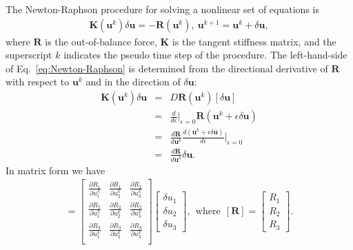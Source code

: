 The Newton-Raphson procedure for solving a nonlinear set of equations is \cite{JavierBonet:2008uxa}
%
\begin{eqnarray}
\pmb{K}(\pmb{u}^k) \delta \pmb{u} = - \pmb{R}(\pmb{u}^k), \ \pmb{u}^{k+1} = \pmb{u}^k + \delta \pmb{u},
\label{eq:Newton-Raphson}
\end{eqnarray}
%
where $\pmb{R}$ is the out-of-balance force, $\pmb{K}$ is the tangent stiffness matrix, and the superscript $k$ indicates the pseudo time step of the procedure. The left-hand-side of  Eq.\ \eqref{eq:Newton-Raphson} is determined from the directional derivative of $\pmb{R}$ with respect to $\pmb{u}^k$ and in the direction of $\delta \pmb{u}$:
%
\begin{eqnarray}
\pmb{K}(\pmb{u}^k) \delta \pmb{u} &=& D\pmb{R}(\pmb{u}^k)[\delta \pmb{u}] \nonumber\\
%
&=& \frac{d}{d\epsilon} \bigg|_{\epsilon=0}\pmb{R}(\pmb{u}^k + \epsilon \delta \pmb{u}) \nonumber\\
&=& \frac{d \pmb{R}}{d\pmb{u}^k} \frac{d(\pmb{u}^k + \epsilon \delta \pmb{u})}{d\epsilon} \bigg|_{\epsilon=0} \nonumber\\
&=& \frac{d \pmb{R}}{d\pmb{u}^k} \delta \pmb{u}.
\label{eq:DR[u]}
\end{eqnarray}
%
In matrix form we have
%
\begin{eqnarray}
[\pmb{K}(\pmb{u}^k)][\delta \pmb{u}] =
%
\begin{bmatrix}
\frac{\partial R_1}{\partial u_1^k} & \frac{\partial R_1}{\partial u_2^k} & \frac{\partial R_1}{\partial u_3^k} \\
%
\frac{\partial R_2}{\partial u_1^k} & \frac{\partial R_2}{\partial u_2^k} & \frac{\partial R_2}{\partial u_3^k} \\
%
\frac{\partial R_3}{\partial u_1^k} & \frac{\partial R_3}{\partial u_2^k} & \frac{\partial R_3}{\partial u_3^k} \\
\end{bmatrix}
%
\begin{bmatrix}
\delta u_1 \\ \delta u_2 \\ \delta u_3
\end{bmatrix}, \ \ \text{where} \ \ 
%
[\pmb{R}] = 
\begin{bmatrix}
R_1 \\ R_2 \\ R_3
\end{bmatrix}.
\label{eq:DR[u]_matrix}
\end{eqnarray}
%

